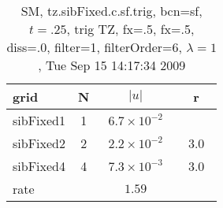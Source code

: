 \begin{table}[hbt]\tableFont %
\begin{center}
\begin{tabular}{|l|c|c|c|} \hline 
grid  & N &  $\vert u \vert$   & r \\ \hline 
           sibFixed1 &     1 & ~$6.7\times10^{ -2}$~ &            \\ \hline
           sibFixed2 &     2 & ~$2.2\times10^{ -2}$~ & ~$  3.0$~  \\ \hline
           sibFixed4 &     4 & ~$7.3\times10^{ -3}$~ & ~$  3.0$~  \\ \hline
    rate             &       &       $1.59$         &        \\ \hline
\end{tabular}
\caption{SM, tz.sibFixed.c.sf.trig, bcn=sf, $t=.25$, trig TZ, fx=.5, fx=.5, diss=.0, filter=1, filterOrder=6, $\lambda=1$, Tue Sep 15 14:17:34 2009}\label{table:tz.sibFixed.c.sf.trig}
\end{center}
\end{table}

